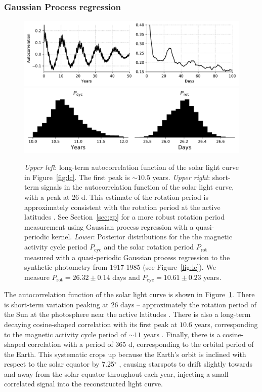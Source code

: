 \subsubsection{Gaussian Process regression}

\begin{figure}
    \centering
    \includegraphics[scale=0.85]{howard/full_acf.pdf}
    \includegraphics[scale=0.85]{howard/periods.pdf}
    \caption{{\it Upper left}: long-term autocorrelation function of the solar light curve in Figure~\ref{fig:lc}. The first peak is $\sim10.5$ years. {\it Upper right}: short-term signals in the autocorrelation function of the solar light curve, with a peak at 26 d. This estimate of the rotation period is approximately consistent with the rotation period at the active latitudes \citep{Howe2000}. See Section~\ref{sec:gp} for a more robust rotation period measurement using Gaussian process regression with a quasi-periodic kernel. {\it Lower}: Posterior distributions for the the magnetic activity cycle period $P_\mathrm{cyc}$ and the solar rotation period $P_\mathrm{rot}$ measured with a quasi-periodic Gaussian process regression to the synthetic photometry from 1917-1985 (see Figure~\ref{fig:lc}). We measure $P_\mathrm{rot}=26.32 \pm 0.14$ days and $P_\mathrm{cyc} = 10.61 \pm 0.23$ years.}
    \label{fig:acf}
\end{figure}


The autocorrelation function of the solar light curve is shown in Figure~\ref{fig:acf}. There is short-term variation peaking at 26 days -- approximately the rotation period of the Sun at the photosphere near the active latitudes \citep{Howe2000}. There is also a long-term decaying cosine-shaped correlation with its first peak at $10.6$ years, corresponding to the magnetic activity cycle period of $\sim 11$ years \citep{Hathaway2015}. Finally, there is a cosine-shaped correlation with a period of 365 d, corresponding to the orbital period of the Earth. This systematic crops up because the Earth's orbit is inclined with respect to the solar equator by 7.25$^\circ$ \citep{meeus}, causing starspots to drift slightly towards and away from the solar equator throughout each year,  injecting a small correlated signal into the reconstructed light curve. 

